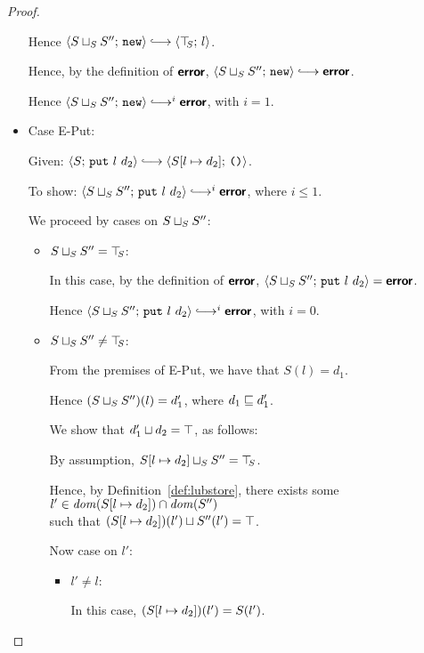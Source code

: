 \begin{proof}
\begin{itemize}
      Hence $\config{\lubstore{S}{S''}}{\NEW} \parstepsto
      \config{\topS}{l}$.

      Hence, by the definition of $\textbf{\textsf{error}}$,
      $\config{\lubstore{S}{S''}}{\NEW} \parstepsto \error$.

      Hence $\config{\lubstore{S}{S''}}{\NEW} \parstepsto^i \error$,
      with $i = 1$.

    \item Case {\sc E-Put}:

      Given: $\config{S}{\putexp{l}{d_2}} \parstepsto
      \config{\extSRaw{S}{l}{d_2}}{\unit}$.

      To show: $\config{\lubstore{S}{S''}}{\putexp{l}{d_2}}
      \parstepsto^i \error$, where $i \leq 1$.

      We proceed by cases on $S \sqcup_{S} S''$:

      \begin{itemize}

        \item $S \sqcup_{S} S'' = \top\hspace{-0.85mm}_{S}$:

          In this case, by the definition of $\textbf{\textsf{error}}$,
          $\langle S \sqcup_{S} S'';\, \mbox{\texttt{put}}~l~d_2 \rangle = \textbf{\textsf{error}}$.

          Hence $\config{\lubstore{S}{S''}}{\putexp{l}{d_2}}
          \parstepsto^i \error$, with $i = 0$.

        \item $S \sqcup_{S} S'' \neq \top\hspace{-0.85mm}_{S}$:

          From the premises of {\sc E-Put}, we have that $S(l) = d_1$.

          Hence $(S \sqcup_{S} S'')(l) = d'_1$, where $d_1 \sqsubseteq
          d'_1$.

          We show that $d'_1 \sqcup d_2 =
          \top$, as follows:

          By assumption, $S[l \mapsto d_2] \sqcup_{S} S'' = \top\hspace{-0.85mm}_{S}$.

          Hence, by Definition~\ref{def:lubstore}, there exists some
          $l' \in \mathit{dom}(S[l \mapsto d_2]) \cap \mathit{dom}(S'')$ \\ such that
          $(S[l \mapsto d_2])(l') \sqcup S''(l') = \top$.

          Now case on $l'$:

          \begin{itemize}
            \item $l' \neq l$:

              In this case, $(S[l \mapsto d_2])(l') = S(l')$.


\end{itemize}
\end{itemize}
\end{itemize}
\end{proof}
